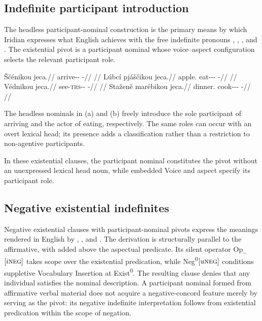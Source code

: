 \subsection{Indefinite participant introduction}
\label{sec:exst-indef-pos}

The headless participant-nominal construction is the primary means by which
Iridian expresses what English achieves with the free indefinite pronouns
, , , and . The
existential pivot is a participant nominal whose voice--aspect configuration selects the
relevant participant role.

\pex
\a
\begingl
\gla Ščénikou jeca.//
\glb arrive-\Pf{}-\Nmlz{} \Exst{}-\Cont{}//
\glft {} //
\endgl
\a
\begingl
\gla Lúbcí pjáščikou jeca.//
\glb apple.\Ind{} eat-\Antip{}-\Pf{}-\Nmlz{} \Exst{}-\Cont{}//
\glft {} //
\endgl
\a
\begingl
\gla Védnikou jeca.//
\glb see-\textsc{trs}-\Pf{}-\Nmlz{} \Exst{}-\Cont{}//
\glft {} //
\endgl
\a
\begingl
\gla Staženě marébikou jeca.//
\glb dinner.\Ind{} cook-\Appl{}-\Pf{}-\Nmlz{} \Exst{}-\Cont{}//
\glft {} //
\endgl
\xe

The headless nominals in (a) and (b) freely introduce the sole participant
of arriving and the actor of eating, respectively. The same roles can occur
with an overt lexical head; its presence adds a classification rather than a
restriction to non-agentive participants.

In these existential clauses, the participant nominal constitutes the pivot
without an unexpressed lexical head noun, while embedded Voice and aspect
specify its participant role.

\subsection{Negative existential indefinites}
\label{sec:exst-indef-neg}

Negative existential clauses with participant-nominal pivots express the
meanings rendered in English by , , and
. The derivation is structurally parallel to the affirmative,
with  added above the aspectual predicate. Its silent operator
$\mathrm{Op}_{\neg}$$[i\textsc{neg}]$ takes scope over the existential predication, while
Neg\textsuperscript{0}$[u\textsc{neg}]$ conditions suppletive Vocabulary Insertion at
Exist\textsuperscript{0}. The resulting clause denies that any individual
satisfies the nominal description. A participant nominal formed from
affirmative verbal material does not acquire a negative-concord feature merely
by serving as the pivot: its negative indefinite interpretation follows from
existential predication within the scope of negation.

